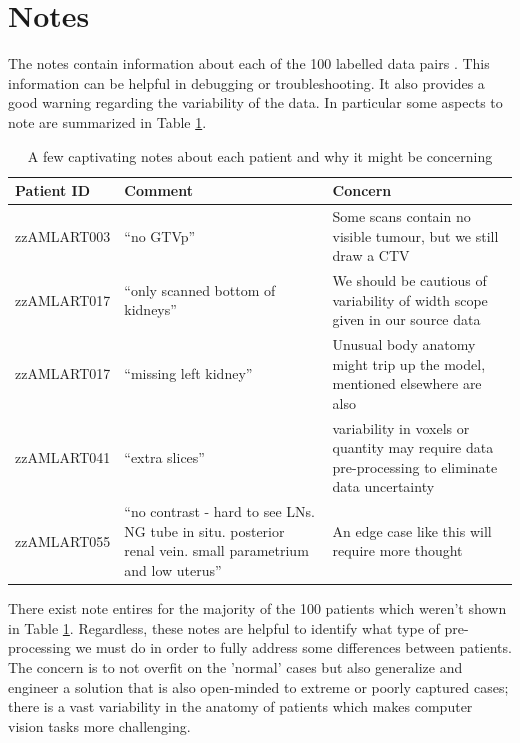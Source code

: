 \documentclass[11pt,twoside]{report}
\begin{document}
\section{Notes}\label{sec:data-notes}

The notes contain information about each of the 100 labelled data pairs \cite{AMLART-data}. This information can be helpful in debugging or troubleshooting. It also provides a good warning regarding the variability of the data. In particular some aspects to note are summarized in Table \ref{tab:notes-summary}.

\begin{table}[ht]
  \centering
  \begin{tabular}{>{\raggedright}p{3cm}p{6cm}p{6cm}}
      \toprule
      \textbf{Patient ID} & \textbf{Comment} & \textbf{Concern} \\
      \midrule
      zzAMLART003 & ``no GTVp'' & Some scans contain no visible tumour, but we still draw a CTV \\
      \midrule
      zzAMLART017 & ``only scanned bottom of kidneys'' & We should be cautious of variability of width scope given in our source data \\
      \midrule
      zzAMLART017 & ``missing left kidney'' & Unusual body anatomy might trip up the model, mentioned elsewhere are also  \\
      \midrule
      zzAMLART041 & ``extra slices'' & variability in voxels or quantity may require data pre-processing to eliminate data uncertainty \\
      \midrule
      zzAMLART055 & ``no contrast - hard to see LNs. NG tube in situ. posterior renal vein. small parametrium and low uterus'' & An edge case like this will require more thought \\
      \bottomrule
  \end{tabular}
  \caption{A few captivating notes about each patient and why it might be concerning}
  \label{tab:notes-summary}
\end{table}

There exist note entires for the majority of the 100 patients which weren't shown in Table \ref{tab:notes-summary}. Regardless, these notes are helpful to identify what type of pre-processing we must do in order to fully address some differences between patients. The concern is to not overfit on the 'normal' cases but also generalize and engineer a solution that is also open-minded to extreme or poorly captured cases; there is a vast variability in the anatomy of patients which makes computer vision tasks more challenging.
\end{document}
